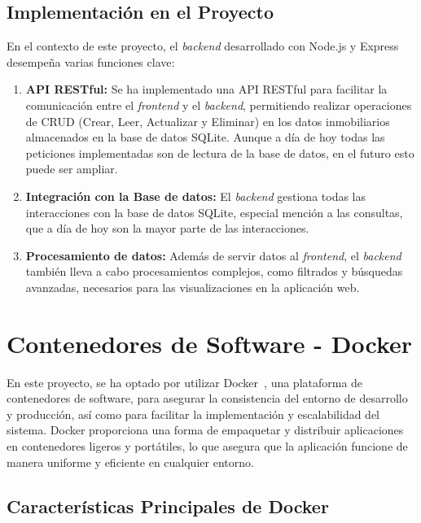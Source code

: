 \subsection{Implementación en el Proyecto}

En el contexto de este proyecto, el \textit{backend} desarrollado con Node.js y Express desempeña varias funciones clave:

\begin{enumerate}
    \item \textbf{API RESTful:} Se ha implementado una API RESTful para facilitar la comunicación entre el \textit{frontend} y el \textit{backend}, permitiendo realizar operaciones de CRUD (Crear, Leer, Actualizar y Eliminar) en los datos inmobiliarios almacenados en la base de datos SQLite. Aunque a día de hoy todas las peticiones implementadas son de lectura de la base de datos, en el futuro esto puede ser ampliar.

    \item \textbf{Integración con la Base de datos:} El \textit{backend} gestiona todas las interacciones con la base de datos SQLite, especial mención a las consultas, que a día de hoy son la mayor parte de las interacciones.


    \item \textbf{Procesamiento de datos:} Además de servir datos al \textit{frontend}, el \textit{backend} también lleva a cabo procesamientos complejos, como filtrados y búsquedas avanzadas, necesarios para las visualizaciones  en la aplicación web.
\end{enumerate}

\clearpage
\section{Contenedores de Software - Docker}

En este proyecto, se ha optado por utilizar Docker~\cite{merkel2014docker}, una plataforma de contenedores de software, para asegurar la consistencia del entorno de desarrollo y producción, así como para facilitar la implementación y escalabilidad del sistema. Docker proporciona una forma de empaquetar y distribuir aplicaciones en contenedores ligeros y portátiles, lo que asegura que la aplicación funcione de manera uniforme y eficiente en cualquier entorno.

\subsection{Características Principales de Docker}

